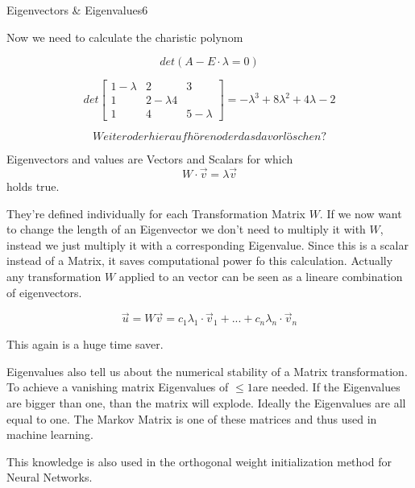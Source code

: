 \begin{questions}
\begin{question}{Eigenvectors \& Eigenvalues}{6}
\begin{answer}
Now we need to calculate the charistic polynom

\begin{equation}
	det(A-E\cdot \lambda = 0)
\end{equation}

\begin{equation}
	det
	\begin{bmatrix}
	1-\lambda & 2 & 3 \\
	1 & 2-\lambda 4 \\
	1 & 4 & 5-\lambda
	\end{bmatrix}
	= -\lambda^3 + 8 \lambda^2 + 4\lambda - 2
\end{equation}

\begin{equation}
	Weiter oder hier aufhören oder das davor löschen?
\end{equation}

Eigenvectors and values are Vectors and Scalars for which 
\begin{equation}
	W\cdot \vec{v} = \lambda \vec{v}
\end{equation}
holds true.

They're defined individually for each Transformation Matrix $W$. 
If we now want to change the length of an Eigenvector we don't need to multiply it with $W$, instead we just multiply it with a corresponding Eigenvalue. Since this is a scalar instead of a Matrix, it saves computational power fo this calculation. Actually any transformation $W$ applied to an vector can be seen as a lineare combination of eigenvectors.

\begin{equation}
	\vec{u} = W \vec{v} = c_1 \lambda_1 \cdot \vec{v}_1 + ... + c_n \lambda_n \cdot \vec{v}_n
\end{equation}

This again is a huge time saver.

Eigenvalues also tell us about the numerical stability of a Matrix transformation. To achieve a vanishing matrix Eigenvalues of $\leq 1$are needed. If the Eigenvalues are bigger than one, than the matrix will explode. Ideally the Eigenvalues are all equal to one. The Markov Matrix is one of these matrices and thus used in machine learning. 

This knowledge is also used in the orthogonal weight initialization method for Neural Networks.


\end{answer}

\end{question}


\end{questions}
